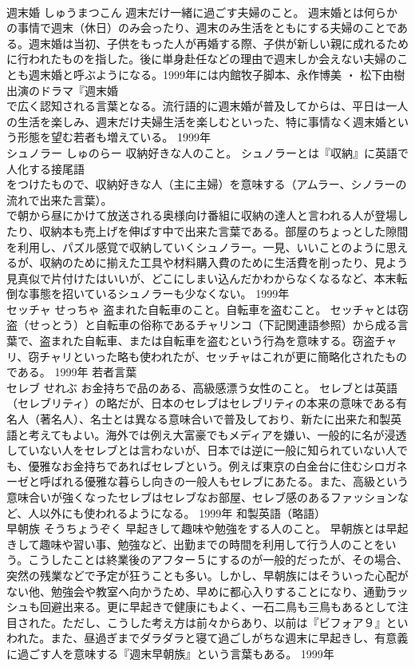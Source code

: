 \documentclass[8pt]{extreport}
\begin{document}
\begin{CJK}{UTF8}{min}
\\	週末婚	しゅうまつこん	週末だけ一緒に過ごす夫婦のこと。	週末婚とは何らかの事情で週末（休日）のみ会ったり、週末のみ生活をともにする夫婦のことである。週末婚は当初、子供をもった人が再婚する際、子供が新しい親に成れるために行われたものを指した。後に単身赴任などの理由で週末しか会えない夫婦のことも週末婚と呼ぶようになる。1999年には内館牧子脚本、永作博美 ・ 松下由樹出演のドラマ『週末婚 
\\	で広く認知される言葉となる。流行語的に週末婚が普及してからは、平日は一人の生活を楽しみ、週末だけ夫婦生活を楽しむといった、特に事情なく週末婚という形態を望む若者も増えている。	1999年	
\\	シュノラー	しゅのらー	収納好きな人のこと。	シュノラーとは『収納』に英語で人化する接尾語
\\	をつけたもので、収納好きな人（主に主婦）を意味する（アムラー、シノラーの流れで出来た言葉）。
\\	で朝から昼にかけて放送される奥様向け番組に収納の達人と言われる人が登場したり、収納本も売上げを伸ばす中で出来た言葉である。部屋のちょっとした隙間を利用し、パズル感覚で収納していくシュノラー。一見、いいことのように思えるが、収納のために揃えた工具や材料購入費のために生活費を削ったり、見よう見真似で片付けたはいいが、どこにしまい込んだかわからなくなるなど、本末転倒な事態を招いているシュノラーも少なくない。	1999年	
\\	セッチャ	せっちゃ	盗まれた自転車のこと。自転車を盗むこと。	セッチャとは窃盗（せっとう）と自転車の俗称であるチャリンコ（下記関連語参照）から成る言葉で、盗まれた自転車、または自転車を盗むという行為を意味する。窃盗チャリ、窃チャリといった略も使われたが、セッチャはこれが更に簡略化されたものである。	1999年	若者言葉	
\\	セレブ	せれぶ	お金持ちで品のある、高級感漂う女性のこと。	セレブとは英語
\\	（セレブリティ）の略だが、日本のセレブはセレブリティの本来の意味である有名人（著名人）、名士とは異なる意味合いで普及しており、新たに出来た和製英語と考えてもよい。海外では例え大富豪でもメディアを嫌い、一般的に名が浸透していない人をセレブとは言わないが、日本では逆に一般に知られていない人でも、優雅なお金持ちであればセレブという。例えば東京の白金台に住むシロガネーゼと呼ばれる優雅な暮らし向きの一般人もセレブにあたる。また、高級という意味合いが強くなったセレブはセレブなお部屋、セレブ感のあるファッションなど、人以外にも使われるようになる。	1999年	和製英語（略語）	
\\	早朝族	そうちょうぞく	早起きして趣味や勉強をする人のこと。	早朝族とは早起きして趣味や習い事、勉強など、出勤までの時間を利用して行う人のことをいう。こうしたことは終業後のアフター５にするのが一般的だったが、その場合、突然の残業などで予定が狂うことも多い。しかし、早朝族にはそういった心配がない他、勉強会や教室へ向かうため、早めに都心入りすることになり、通勤ラッシュも回避出来る。更に早起きで健康にもよく、一石二鳥も三鳥もあるとして注目された。ただし、こうした考え方は前々からあり、以前は『ビフォア９』といわれた。また、昼過ぎまでダラダラと寝て過ごしがちな週末に早起きし、有意義に過ごす人を意味する『週末早朝族』という言葉もある。	1999年	

\end{CJK}
\end{document}
